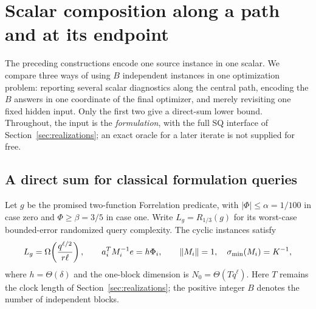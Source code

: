 \section{Scalar composition along a path and at its endpoint}\label{sec:temporal}
The preceding constructions encode one source instance in one scalar.
We compare three ways of using $B$ independent instances in one
optimization problem: reporting several scalar diagnostics along the
central path, encoding the $B$ answers in one coordinate of the final
optimizer, and merely revisiting one fixed hidden input.  Only the first
two give a direct-sum lower bound.  Throughout, the
input is the \emph{formulation}, with the full SQ
interface of Section~\ref{sec:realizations}; an exact oracle for a later
iterate is not supplied for free.

\subsection{A direct sum for classical formulation queries}
Let $g$ be the promised two-function Forrelation predicate, with
$|\Phi|\leq\alpha=1/100$ in case zero and $\Phi\geq\beta=3/5$ in
case one.  Write $L_g=R_{1/3}(g)$ for its worst-case bounded-error
randomized query complexity.  The cyclic instances satisfy
\[
 L_g=\Omega\!\left(\frac{q^{\ell/2}}{r\ell}\right),\qquad
 a_i^TM_i^{-1}e=h\Phi_i,\qquad
 \left\lVert M_i\right\rVert=1,\quad\sigma_{\min}(M_i)=K^{-1},
\]
where $h=\Theta(\delta)$ and the one-block dimension is
$N_0=\Theta(Tq^\ell)$.  Here $T$ remains the clock length of
Section~\ref{sec:realizations}; the positive integer $B$ denotes the number
of independent blocks.

